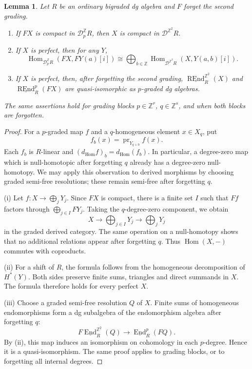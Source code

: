 \documentclass[12pt,a4paper,english,reqno]{amsart}
\theoremstyle{plain}
\newtheorem{lem}[thm]{Lemma}
\theoremstyle{definition}
\numberwithin{equation}{section}
\def\Hom{\operatorname{Hom}}
\def\End{\operatorname{End}}
\def\calD{{\mathcal D}}
\def\bbZ{{\mathbb Z}}
\def\iso{\cong}
\def\Ds{\bigoplus}
\def\REnd{\operatorname{REnd}}
\newcommand{\uREnd}{\underline{\REnd}}
\begin{document}
\begin{lem}\label{lem:forget}
Let $R$ be an ordinary bigraded dg algebra and $F$ forget the second grading.
\begin{enumerate}[label=(\roman*)]
\item If $FX$ is compact in $\calD^{\bbZ}_pR$, then $X$ is compact in $\calD^{\bbZ^2}R$.
\item If $X$ is perfect, then for any $Y$,
\[
 \Hom_{\calD^{\bbZ}_pR}(FX,FY(a)[i])
 \iso\Ds_{b\in\bbZ}
 \Hom_{\calD^{\bbZ^2}R}(X,Y(a,b)[i]).
\]
\item If $X$ is perfect, then, after forgetting the second grading, $\uREnd^{\bbZ^2}_R(X)$ and $\uREnd^p_R(FX)$ are quasi-isomorphic as $p$-graded dg algebras.
\end{enumerate}
The same assertions hold for grading blocks $p\in\bbZ^r$, $q\in\bbZ^s$, and when both blocks are forgotten.
\end{lem}
\begin{proof}
For a $p$-graded map $f$ and a $q$-homogeneous element $x\in X_q$, put
\[
 f_b(x)=\operatorname{pr}_{Y_{q+b}}f(x).
\]
Each $f_b$ is $R$-linear and $(d_{\Hom}f)_b=d_{\Hom}(f_b)$. In particular, a degree-zero map which is null-homotopic after forgetting $q$ already has a degree-zero null-homotopy. We may apply this observation to derived morphisms by choosing graded semi-free resolutions; these remain semi-free after forgetting $q$.

(i) Let $f:X\to\Ds_jY_j$. Since $FX$ is compact, there is a finite set $I$ such that $Ff$ factors through $\Ds_{j\in I}FY_j$. Taking the $q$-degree-zero component, we obtain
\[
 X\longrightarrow\Ds_{j\in I}Y_j
 \longrightarrow\Ds_jY_j
\]
in the graded derived category. The same operation on a null-homotopy shows that no additional relations appear after forgetting $q$. Thus $\Hom(X,-)$ commutes with coproducts.

(ii) For a shift of $R$, the formula follows from the homogeneous decomposition of $H^*(Y)$. Both sides preserve finite sums, triangles and direct summands in $X$. The formula therefore holds for every perfect $X$.

(iii) Choose a graded semi-free resolution $Q$ of $X$. Finite sums of homogeneous endomorphisms form a dg subalgebra of the endomorphism algebra after forgetting $q$:
\[
 F\underline{\End}^{\bbZ^2}_R(Q)\longrightarrow\underline{\End}^p_R(FQ).
\]
By (ii), this map induces an isomorphism on cohomology in each $p$-degree. Hence it is a quasi-isomorphism. The same proof applies to grading blocks, or to forgetting all internal degrees.
\end{proof}
\end{document}
